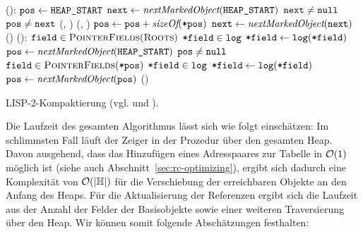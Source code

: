 \begin{algorithm}[h]
\begin{algorithmic}[1]
	\State \Atomic {}():
	\State \quad $\texttt{pos} \gets \texttt{HEAP\_START}$	
	\State \quad $\texttt{next} \gets \textit{nextMarkedObject}(\texttt{HEAP\_START})$ 
	\State \quad \WHILE $\texttt{next} \neq \texttt{null}$			
	\State \quad \quad \IF $\texttt{pos} \neq \texttt{next}$	
	\State \quad \quad \quad {}(, )		
	\State \quad \quad \quad {}(, )	
	\State \quad \quad $\texttt{pos} \gets \texttt{pos} + \textit{sizeOf}(\texttt{*pos})$
	\State \quad \quad $\texttt{next} \gets \textit{nextMarkedObject}(\texttt{next})$
	\State \quad {}()
	\Statex
	\State {}():
	\State \quad \FOREACH $\texttt{field} \in \textsc{PointerFields}(\textsc{Roots})$
	\State \quad \quad \IF $\texttt{*field} \in \texttt{log}$ 
	\State \quad \quad \quad $\texttt{*field} \gets \texttt{log}(\texttt{*field})$
	\State \quad $\texttt{pos} \gets \textit{nextMarkedObject}(\texttt{HEAP\_START})$		
	\State \quad \WHILE $\texttt{pos} \neq \texttt{null}$
	\State \quad \quad \FOREACH $\texttt{field} \in \textsc{PointerFields}(\texttt{*pos})$
	\State \quad \quad \quad \IF $\texttt{*field} \in \texttt{log}$
	\State \quad \quad \quad \quad $\texttt{*field} \gets \texttt{log}(\texttt{*field})$
	\State \quad \quad $\texttt{pos} \gets \textit{nextMarkedObject}(\texttt{pos})$
	\State \quad {}()		
\end{algorithmic}
\caption[LISP-2-Kompaktierung]{LISP-2-Kompaktierung (vgl. \cite[S. 35]{handbook} und \cite[S. 7ff]{lisp2gc}).}
\label{algo:lisp2gc}
\end{algorithm}

Die Laufzeit des gesamten Algorithmus lässt sich wie folgt einschätzen:
Im schlimmsten Fall läuft der Zeiger  in der Prozedur  über den gesamten Heap.
Davon ausgehend, dass das Hinzufügen eines Adresspaares zur Tabelle  in $\mathcal{O}(1)$ möglich ist  (siehe auch Abschnitt~\ref{sec:rc-optimizing}), ergibt sich dadurch eine Komplexität von $\mathcal{O}(\left\lvert\mathbb{H}\right\rvert)$ für die Verschiebung der erreichbaren Objekte an den Anfang des Heaps.
Für die Aktualisierung der Referenzen ergibt sich die Laufzeit aus der Anzahl der Felder der Basisobjekte sowie einer weiteren Traversierung über den Heap.
Wir können somit folgende Abschätzungen festhalten:

